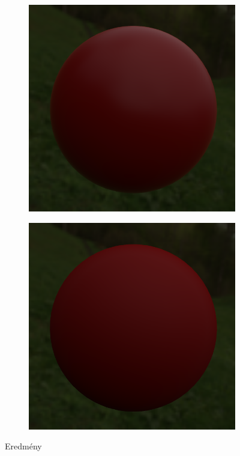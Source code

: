 \begin{figure}[!ht]
\begin{subfigure}[b]{0.27\textwidth}
        \includegraphics[width=\textwidth]{images/scr_r05.png}
    \end{subfigure}
    \hfill
    \begin{subfigure}[b]{0.27\textwidth}
        \centering
        \includegraphics[width=\textwidth]{images/scr_r0.png}
    \end{subfigure}
    \caption{Eredmény}
\end{figure}

